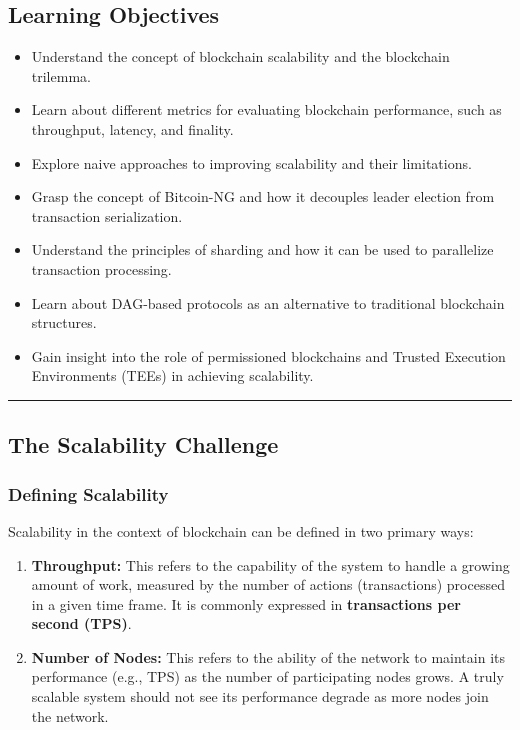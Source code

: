 \subsection{Learning Objectives}\label{learning-objectives}

\begin{itemize}
\tightlist
\item
  Understand the concept of blockchain scalability and the blockchain
  trilemma.
\item
  Learn about different metrics for evaluating blockchain performance,
  such as throughput, latency, and finality.
\item
  Explore naive approaches to improving scalability and their
  limitations.
\item
  Grasp the concept of Bitcoin-NG and how it decouples leader election
  from transaction serialization.
\item
  Understand the principles of sharding and how it can be used to
  parallelize transaction processing.
\item
  Learn about DAG-based protocols as an alternative to traditional
  blockchain structures.
\item
  Gain insight into the role of permissioned blockchains and Trusted
  Execution Environments (TEEs) in achieving scalability.
\end{itemize}

\begin{center}\rule{0.5\linewidth}{0.5pt}\end{center}

\subsection{The Scalability
Challenge}\label{section-1-the-scalability-challenge}

\subsubsection{Defining Scalability}\label{defining-scalability}

Scalability in the context of blockchain can be defined in two primary
ways:

\begin{enumerate}
\def\labelenumi{\arabic{enumi}.}
\tightlist
\item
  \textbf{Throughput:} This refers to the capability of the system to
  handle a growing amount of work, measured by the number of actions
  (transactions) processed in a given time frame. It is commonly
  expressed in \textbf{transactions per second (TPS)}.
\item
  \textbf{Number of Nodes:} This refers to the ability of the network to
  maintain its performance (e.g., TPS) as the number of participating
  nodes grows. A truly scalable system should not see its performance
  degrade as more nodes join the network.
\end{enumerate}

